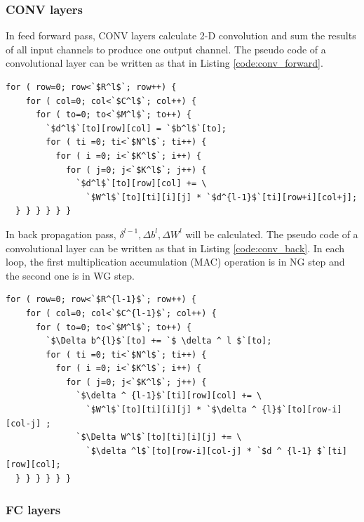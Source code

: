 \subsubsection{CONV layers}
In feed forward pass, CONV layers calculate 2-D convolution and sum the results of all input channels to produce one output channel. The pseudo code of a convolutional layer can be written as that in Listing \ref{code:conv_forward}.
  
\begin{minipage}{\linewidth}
\begin{lstlisting}[caption=Conv Forward, label=code:conv_forward]  
  for ( row=0; row<`$R^l$`; row++) { 
    for ( col=0; col<`$C^l$`; col++) { 
      for ( to=0; to<`$M^l$`; to++) { 
        `$d^l$`[to][row][col] = `$b^l$`[to];
        for ( ti =0; ti<`$N^l$`; ti++) { 
          for ( i =0; i<`$K^l$`; i++) { 
            for ( j=0; j<`$K^l$`; j++) {
              `$d^l$`[to][row][col] += \
                `$W^l$`[to][ti][i][j] * `$d^{l-1}$`[ti][row+i][col+j];
  } } } } } }

\end{lstlisting}
\end{minipage}

In back propagation pass, $\delta ^{l-1} , \Delta b^l, \Delta W^l$ will be calculated. The pseudo code of a convolutional layer can be written as that in Listing \ref{code:conv_back}. In each loop, the first multiplication accumulation (MAC) operation is in NG step and the second one is in WG step.
    
\begin{minipage}{\linewidth}
\begin{lstlisting}[caption=Conv Back propagation, label=code:conv_back]  
  for ( row=0; row<`$R^{l-1}$`; row++) { 
    for ( col=0; col<`$C^{l-1}$`; col++) { 
      for ( to=0; to<`$M^l$`; to++) { 
        `$\Delta b^{l}$`[to] += `$ \delta ^ l $`[to];
        for ( ti =0; ti<`$N^l$`; ti++) { 
          for ( i =0; i<`$K^l$`; i++) { 
            for ( j=0; j<`$K^l$`; j++) {
              `$\delta ^ {l-1}$`[ti][row][col] += \
                `$W^l$`[to][ti][i][j] * `$\delta ^ {l}$`[to][row-i][col-j] ;
              `$\Delta W^l$`[to][ti][i][j] += \
                `$\delta ^l$`[to][row-i][col-j] * `$d ^ {l-1} $`[ti][row][col];
  } } } } } }

\end{lstlisting}
\end{minipage}

\subsubsection{FC layers} \label{sec:prelim:fc}

